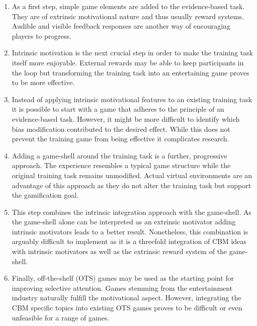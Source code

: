 \begin{enumerate}
    \item As a first step, simple game elements are added to the evidence-based task. They are of extrinsic motivational nature and thus usually reward systems. Audible and visible feedback responses are another way of encouraging players to progress.
    \item Intrinsic motivation is the next crucial step in order to make the training task itself more enjoyable. External rewards may be able to keep participants in the loop but transforming the training task into an entertaining game proves to be more effective.
    \item Instead of applying intrinsic motivational features to an existing training task it is possible to start with a game that adheres to the principle of an evidence-based task. However, it might be more difficult to identify which bias modification contributed to the desired effect. While this does not prevent the training game from being effective it complicates research.
    \item Adding a game-shell around the training task is a further, progressive approach. The experience resembles a typical game structure while the original training task remains unmodified. Actual virtual environments are an advantage of this approach as they do not alter the training task but support the gamification goal.
    \item This step combines the intrinsic integration approach with the game-shell. As the game-shell alone can be interpreted as an extrinsic motivator adding intrinsic motivators leads to a better result. Nonetheless, this combination is arguably difficult to implement as it is a threefold integration of CBM ideas with intrinsic motivators as well as the extrinsic reward system of the game-shell.
    \item Finally, off-the-shelf (OTS) games may be used as the starting point for improving selective attention. Games stemming from the entertainment industry naturally fulfill the motivational aspect. However, integrating the CBM specific topics into existing OTS games proves to be difficult or even unfeasible for a range of games.
\end{enumerate}
